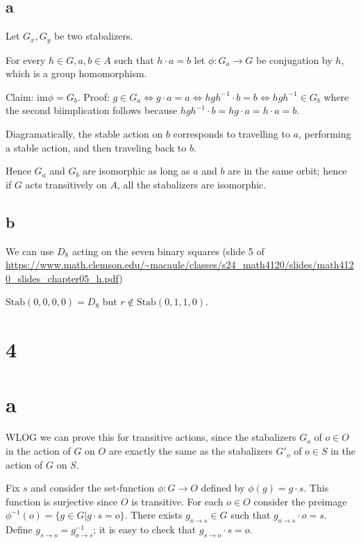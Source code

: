 \documentclass{article}
\def\inv{{-1}}
\def\im{\textrm{im}}
\def\Stab{\textrm{Stab}}
\begin{document}
\subsection*{a}

Let $G_x, G_y$ be two stabalizers.

For every $h \in G, a, b \in A$ such that $h \cdot a = b$ let $\phi: G_a \to G$ be conjugation by $h$, which is a group homomorphism.

Claim: $\im \phi = G_b$. Proof: $g \in G_a \iff g \cdot a = a \iff h g h^\inv \cdot b = b \iff hgh^\inv \in G_b$ where the second biimplication follows because $hgh^\inv \cdot b = hg \cdot a = h \cdot a = b$.

Diagramatically, the stable action on $b$ corresponds to travelling to $a$, performing a stable action, and then traveling back to $b$.

Hence $G_a$ and $G_b$ are isomorphic as long as $a$ and $b$ are in the same orbit; hence if $G$ acts transitively on $A$, all the stabalizers are isomorphic.

\subsection*{b}

We can use $D_8$ acting on the seven binary squares (slide 5 of \url{https://www.math.clemson.edu/~macaule/classes/s24_math4120/slides/math4120_slides_chapter05_h.pdf})

$\Stab(0,0,0,0) = D_8$ but $r \not\in \Stab(0,1,1,0)$.

\section*{4}

\section*{a}

WLOG we can prove this for transitive actions, since the stabalizers $G_o$ of $o \in O$ in the action of $G$ on $O$ are exactly the same as the stabalizers $G'_o$ of $o \in S$ in the action of $G$ on $S$.

Fix $s$ and consider the set-function $\phi : G \to O$ defined by $\phi(g) = g \cdot s$. This function is surjective since $O$ is transitive. For each $o \in O$ consider the preimage $\phi^\inv(o) = \{g \in G | g \cdot s = o \}$. There exists $g_{o \to s} \in G$ such that $g_{o \to s} \cdot o = s$. Define $g_{s \to o} = g_{o \to s}^\inv$; it is easy to check that $g_{s \to o} \cdot s = o$.
\end{document}
